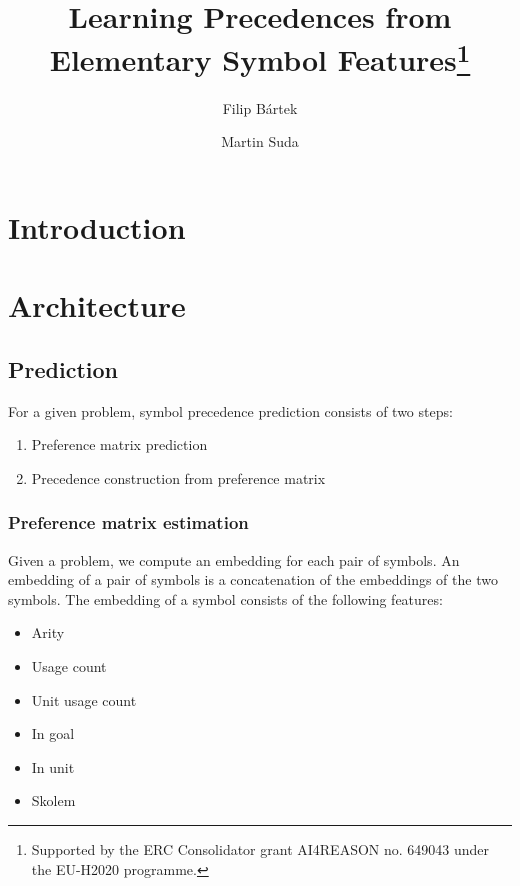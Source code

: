 

\title{Learning Precedences from Elementary Symbol Features\thanks{Supported by the ERC Consolidator grant AI4REASON no. 649043 under the EU-H2020 programme.}}
\author{Filip B\'{a}rtek \and Martin Suda}



\maketitle

\section{Introduction}

\section{Architecture}

\subsection{Prediction}

For a given problem, symbol precedence prediction consists of two steps:

\begin{enumerate}
	\item Preference matrix prediction
	\item Precedence construction from preference matrix
\end{enumerate}

\subsubsection{Preference matrix estimation}

Given a problem, we compute an embedding for each pair of symbols.
An embedding of a pair of symbols is a concatenation of the embeddings of the two symbols.
The embedding of a symbol consists of the following features:

\begin{itemize}
	\item Arity
	\item Usage count
	\item Unit usage count
	\item In goal
	\item In unit
	\item Skolem
\end{itemize}

